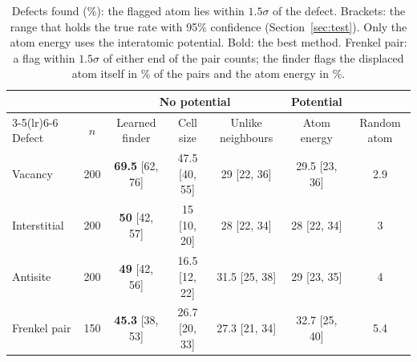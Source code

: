 \begin{table}[t]
\centering
\caption{Defects found (\%): the flagged atom lies within $1.5\sigma$ of the defect. Brackets: the range that holds the true rate with 95\% confidence (Section~\ref{sec:test}). Only the atom energy uses the interatomic potential. Bold: the best method. Frenkel pair: a flag within $1.5\sigma$ of either end of the pair counts; the finder flags the displaced atom itself in \% of the pairs and the atom energy in \%.}
\label{tab:found}
\footnotesize\setlength{\tabcolsep}{3.5pt}
\begin{tabular}{@{}lcccccc@{}}
\toprule
 & & \multicolumn{3}{c}{No potential} & Potential & \\
\cmidrule(lr){3-5}\cmidrule(lr){6-6}
Defect & $n$ & Learned finder & Cell size & Unlike neighbours & Atom energy & Random atom \\
\midrule
Vacancy & 200 & \textbf{69.5} {\scriptsize[62, 76]} & 47.5 {\scriptsize[40, 55]} & 29 {\scriptsize[22, 36]} & 29.5 {\scriptsize[23, 36]} & 2.9 \\
Interstitial & 200 & \textbf{50} {\scriptsize[42, 57]} & 15 {\scriptsize[10, 20]} & 28 {\scriptsize[22, 34]} & 28 {\scriptsize[22, 34]} & 3 \\
Antisite & 200 & \textbf{49} {\scriptsize[42, 56]} & 16.5 {\scriptsize[12, 22]} & 31.5 {\scriptsize[25, 38]} & 29 {\scriptsize[23, 35]} & 4 \\
Frenkel pair & 150 & \textbf{45.3} {\scriptsize[38, 53]} & 26.7 {\scriptsize[20, 33]} & 27.3 {\scriptsize[21, 34]} & 32.7 {\scriptsize[25, 40]} & 5.4 \\
\bottomrule
\end{tabular}
\end{table}
